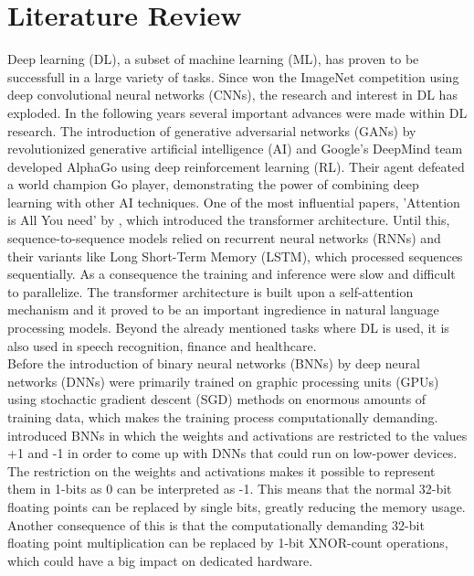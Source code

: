 \section{Literature Review}

Deep learning (DL), a subset of machine learning (ML), has proven to be successfull in a large variety of tasks. Since \cite{imagenet2012} won the ImageNet competition using deep convolutional neural networks (CNNs), the research and interest in DL has exploded. In the following years several important advances were made within DL research. The introduction of generative adversarial networks (GANs) by \cite{goodfellow2014} revolutionized generative artificial intelligence (AI) and Google's DeepMind team developed AlphaGo using deep reinforcement learning (RL). Their agent defeated a world champion Go player, demonstrating the power of combining deep learning with other AI techniques. One of the most influential papers, 'Attention is All You need' by \cite{attention2017}, which introduced the transformer architecture. Until this, sequence-to-sequence models relied on recurrent neural networks (RNNs) and their variants like Long Short-Term Memory (LSTM), which processed sequences sequentially. As a consequence the training and inference were slow and difficult to parallelize. The transformer architecture is built upon a self-attention mechanism and it proved to be an important ingredience in natural language processing models. Beyond the already mentioned tasks where DL is used, it is also used in speech recognition, finance and healthcare. \\

\noindent Before the introduction of binary neural networks (BNNs) by \cite{Hubara2016} deep neural networks (DNNs) were primarily trained on graphic processing units (GPUs) using stochactic gradient descent (SGD) methods on enormous amounts of training data, which makes the training process computationally demanding. \cite{Hubara2016} introduced BNNs in which the weights and activations are restricted to the values +1 and -1 in order to come up with DNNs that could run on low-power devices. The restriction on the weights and activations makes it possible to represent them in 1-bits as 0 can be interpreted as -1. This means that the normal 32-bit floating points can be replaced by single bits, greatly reducing the memory usage. Another consequence of this is that the computationally demanding 32-bit floating point multiplication can be replaced by 1-bit XNOR-count operations, which could have a big impact on dedicated hardware. \\

